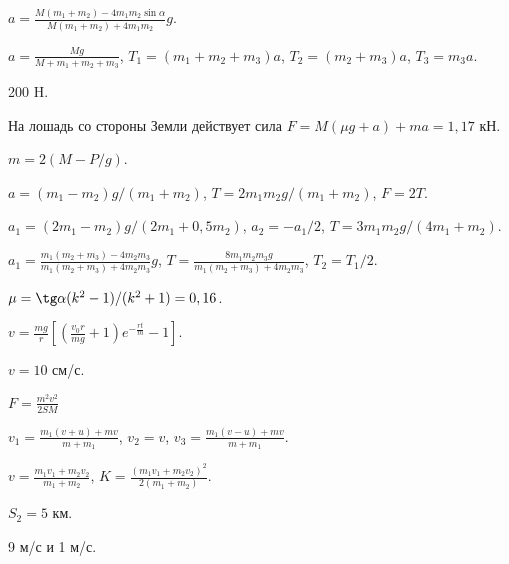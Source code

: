 \begin{Answer}{48}
$a = \frac{M(m_1 + m_2) - 4 m_1 m_2 \sin \alpha}{M(m_1 + m_2) + 4 m_1 m_2}g$.
\end{Answer}
\begin{Answer}{49}
$a = \frac{Mg}{M + m_1 +m_2 +m_3}$, $T_1 = (m_1 +m_2 +m_3)a$, $T_2 = (m_2 +m_3)a$, $T_3 = m_3 a$.
\end{Answer}
\begin{Answer}{50}
200 H.
\end{Answer}
\begin{Answer}{51}
На лошадь со стороны Земли действует сила $F = M(\mu g + a) + ma = 1,17$ кН.
\end{Answer}
\begin{Answer}{52}
$m = 2(M - P/g)$.
\end{Answer}
\begin{Answer}{53}
$a = (m_1 - m_2)g / (m_1 + m_2)$, $T = 2 m_1 m_2 g /(m_1 + m_2)$, $F = 2T$.
\end{Answer}
\begin{Answer}{54}
$a_1 = (2m_1-m_2)g/(2m_1+0,5m_2)$, $a_2 = -a_1/2$, $T=3m_1 m_2g/(4m_1 + m_2)$.
\end{Answer}
\begin{Answer}{55}
$a_1 = \frac{m_1(m_2+m_3)-4m_2m_3}{m_1(m_2+m_3)+4m_2m_3}g$, $T= \frac{8m_1m_2m_3g}{m_1(m_2+m_3)+4m_2m_3}$, $T_2 = T_1/2$.
\end{Answer}
\begin{Answer}{56}
$\mu = \tg \alpha (k^2-1)/(k^2+1) = 0,16$.
\end{Answer}
\begin{Answer}{57}
$v = \frac{mg}{r}\left[ \left( \frac{v_0r}{mg} +1 \right)e^{-\frac{rt}{m}} - 1 \right]$.
\end{Answer}
\begin{Answer}{58}
$v=10$ см/с.
\end{Answer}
\begin{Answer}{59}
$F = \frac{m^2 v^2}{2SM}$
\end{Answer}
\begin{Answer}{60}
$v_1 = \frac{m_1(v+u)+mv}{m+m_1}$, $v_2 = v$, $v_3 = \frac{m_1(v-u)+mv}{m+m_1}$.
\end{Answer}
\begin{Answer}{61}
$v = \frac{m_1v_1 + m_2v_2}{m_1+m_2}$, $K = \frac{(m_1v_1+m_2v_2)^2}{2(m_1+m_2)}$.
\end{Answer}
\begin{Answer}{62}
$S_2 = 5$ км.
\end{Answer}
\begin{Answer}{63}
9 м/с и 1 м/с.
\end{Answer}

